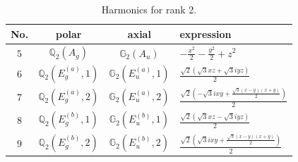 \documentclass[fleqn,8pt,landscape]{jsarticle}
\begin{document}
\begin{table}[ht!]
\begin{center}
\caption{Harmonics for rank 2.}
\renewcommand{\arraystretch}{1.3}
\begin{tabular}{cccl} \hline \hline
No. & polar & axial & expression \\ \hline
$ 5 $ & $ \mathbb{Q}_{2}(A_{g}) $ & $ \mathbb{G}_{2}(A_{u}) $ & $ - \frac{x^{2}}{2} - \frac{y^{2}}{2} + z^{2} $ \\
$ 6 $ & $ \mathbb{Q}_{2}(E_{g}^{(a)},1) $ & $ \mathbb{G}_{2}(E_{u}^{(a)},1) $ & $ \frac{\sqrt{2} \left(\sqrt{3} x z + \sqrt{3} i y z\right)}{2} $ \\
$ 7 $ & $ \mathbb{Q}_{2}(E_{g}^{(a)},2) $ & $ \mathbb{G}_{2}(E_{u}^{(a)},2) $ & $ \frac{\sqrt{2} \left(- \sqrt{3} i x y + \frac{\sqrt{3} \left(x - y\right) \left(x + y\right)}{2}\right)}{2} $ \\
$ 8 $ & $ \mathbb{Q}_{2}(E_{g}^{(b)},1) $ & $ \mathbb{G}_{2}(E_{u}^{(b)},1) $ & $ \frac{\sqrt{2} \left(\sqrt{3} x z - \sqrt{3} i y z\right)}{2} $ \\
$ 9 $ & $ \mathbb{Q}_{2}(E_{g}^{(b)},2) $ & $ \mathbb{G}_{2}(E_{u}^{(b)},2) $ & $ \frac{\sqrt{2} \left(\sqrt{3} i x y + \frac{\sqrt{3} \left(x - y\right) \left(x + y\right)}{2}\right)}{2} $ \\
 \hline \hline
\end{tabular}
\end{center}
\end{table}
\end{document}
